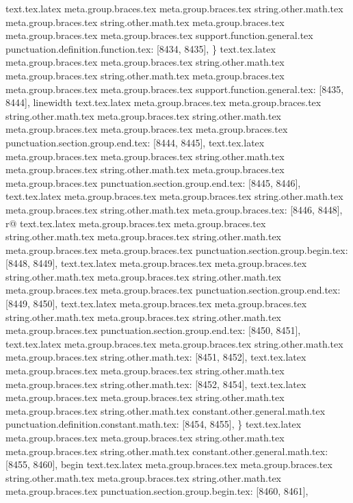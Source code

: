 {{{{{{{{{{{{{{{{{{{{{{{{{{{{{{{{{{{{{{{{{{{{{{{{{{{{{{{{{{{{{{{{{{{{{{{{{{{{{{{{{{{{{{{{{{{{{{{{{{{{{{{{{{{{{{{{{{{{{{{{{{{{{{{{{{{{{{{{{{{{{{{{{{{{{{{{{{{{{{{{{{{{{{{{{{{{{{{{{{{{{{{{{{{{{{{{{{{{{{{{{{{{{{{{{{{{{{{{{{{{{{{{{{{{{{{{{{{{{{{{{{{{{{{{{{{text.tex.latex meta.group.braces.tex meta.group.braces.tex string.other.math.tex meta.group.braces.tex string.other.math.tex meta.group.braces.tex meta.group.braces.tex meta.group.braces.tex support.function.general.tex punctuation.definition.function.tex: [8434, 8435], {\}
text.tex.latex meta.group.braces.tex meta.group.braces.tex string.other.math.tex meta.group.braces.tex string.other.math.tex meta.group.braces.tex meta.group.braces.tex meta.group.braces.tex support.function.general.tex: [8435, 8444], {linewidth}
text.tex.latex meta.group.braces.tex meta.group.braces.tex string.other.math.tex meta.group.braces.tex string.other.math.tex meta.group.braces.tex meta.group.braces.tex meta.group.braces.tex punctuation.section.group.end.tex: [8444, 8445], {}}
text.tex.latex meta.group.braces.tex meta.group.braces.tex string.other.math.tex meta.group.braces.tex string.other.math.tex meta.group.braces.tex meta.group.braces.tex punctuation.section.group.end.tex: [8445, 8446], {}}
text.tex.latex meta.group.braces.tex meta.group.braces.tex string.other.math.tex meta.group.braces.tex string.other.math.tex meta.group.braces.tex: [8446, 8448], {r@}
text.tex.latex meta.group.braces.tex meta.group.braces.tex string.other.math.tex meta.group.braces.tex string.other.math.tex meta.group.braces.tex meta.group.braces.tex punctuation.section.group.begin.tex: [8448, 8449], {{}
text.tex.latex meta.group.braces.tex meta.group.braces.tex string.other.math.tex meta.group.braces.tex string.other.math.tex meta.group.braces.tex meta.group.braces.tex punctuation.section.group.end.tex: [8449, 8450], {}}
text.tex.latex meta.group.braces.tex meta.group.braces.tex string.other.math.tex meta.group.braces.tex string.other.math.tex meta.group.braces.tex punctuation.section.group.end.tex: [8450, 8451], {}}
text.tex.latex meta.group.braces.tex meta.group.braces.tex string.other.math.tex meta.group.braces.tex string.other.math.tex: [8451, 8452], {
}
text.tex.latex meta.group.braces.tex meta.group.braces.tex string.other.math.tex meta.group.braces.tex string.other.math.tex: [8452, 8454], {  }
text.tex.latex meta.group.braces.tex meta.group.braces.tex string.other.math.tex meta.group.braces.tex string.other.math.tex constant.other.general.math.tex punctuation.definition.constant.math.tex: [8454, 8455], {\}
text.tex.latex meta.group.braces.tex meta.group.braces.tex string.other.math.tex meta.group.braces.tex string.other.math.tex constant.other.general.math.tex: [8455, 8460], {begin}
text.tex.latex meta.group.braces.tex meta.group.braces.tex string.other.math.tex meta.group.braces.tex string.other.math.tex meta.group.braces.tex punctuation.section.group.begin.tex: [8460, 8461], {{}
}}}}}}}}}}}}}}}}}}}}}}}}}}}}}}}}}}}}}}}}}}}}}}}}}}}}}}}}}}}}}}}}}}}}}}}}}}}}}}}}}}}}}}}}}}}}}}}}}}}}}}}}}}}}}}}}}}}}}}}}}}}}}}}}}}}}}}}}}}}}}}}}}}}}}}}}}}}}}}}}}}}}}}}}}}}}}}}}}}}}}}}}}}}}}}}}}}}}}}}}}}}}}}}}}}}}}}}}}}}}}}}}}}}}}}}}}}}}}}}}}}}}}}}}}}}
